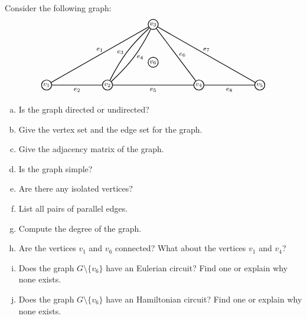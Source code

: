 \documentclass[11pt,letterpaper]{article}
\begin{document}

 Consider the following graph:
	\[
	\graphOne
	\]

\begin{enumerate}[(a)]
\item Is the graph directed or undirected?
\item Give the vertex set and the edge set for the graph.
\item Give the adjacency matrix of the graph.
\item Is the graph simple?
\item Are there any isolated vertices?
\item List all pairs of parallel edges.
\item Compute the degree of the graph.  
\item Are the vertices $v_1$ and $v_6$ connected? What about the vertices $v_1$ and $v_4$? 
\item Does the graph $G \setminus \{ v_6 \}$ have an Eulerian circuit? Find one or explain why none exists.  
\item Does the graph $G \setminus \{ v_6 \}$ have an Hamiltonian circuit? Find one or explain why none exists.  
\end{enumerate} \pspace
\end{document}
